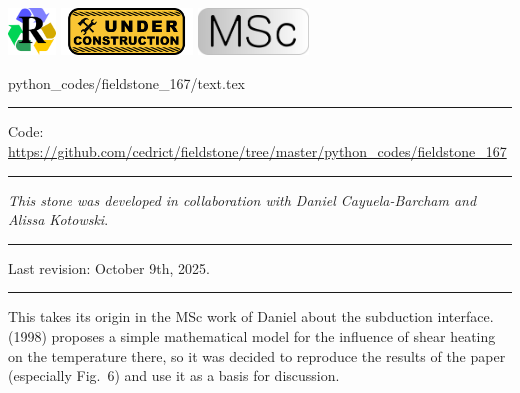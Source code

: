 \noindent
\includegraphics[height=1.25cm]{images/pictograms/replication}
\includegraphics[height=1.25cm]{images/pictograms/under_construction}
\includegraphics[height=1.25cm]{images/pictograms/msc}


\begin{flushright} {\tiny {\color{gray} python\_codes/fieldstone\_167/text.tex}} \end{flushright}

%

\par\noindent\rule{\textwidth}{0.4pt}

\begin{center}
\inpython
{\small Code: \url{https://github.com/cedrict/fieldstone/tree/master/python_codes/fieldstone_167}}
\end{center}

\par\noindent\rule{\textwidth}{0.4pt}

{\sl This stone was developed in collaboration with Daniel Cayuela-Barcham and Alissa Kotowski}. 

\par\noindent\rule{\textwidth}{0.4pt}

Last revision: October 9th, 2025.

\par\noindent\rule{\textwidth}{0.4pt}


This \stone takes its origin in the MSc work of Daniel about the subduction interface. 
\textcite{stuw98} (1998) proposes a simple mathematical model for the influence 
of shear heating on the temperature there, so it was decided to 
reproduce the results of the paper (especially Fig.~6) and use it as a basis for discussion.

